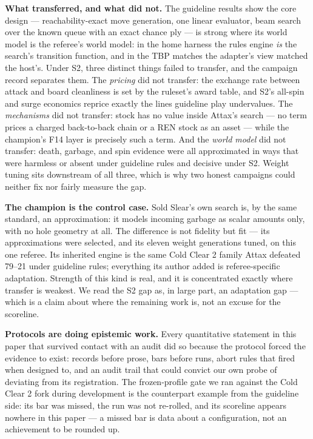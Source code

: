 \documentclass[
  11pt,
]{article}
\begin{document}
\textbf{What transferred, and what did not.} The guideline results show
the core design --- reachability-exact move generation, one linear
evaluator, beam search over the known queue with an exact chance ply ---
is strong where its world model is the referee's world model: in the
home harness the rules engine \emph{is} the search's transition
function, and in the TBP matches the adapter's view matched the host's.
Under S2, three distinct things failed to transfer, and the campaign
record separates them. The \emph{pricing} did not transfer: the exchange
rate between attack and board cleanliness is set by the ruleset's award
table, and S2's all-spin and surge economics reprice exactly the lines
guideline play undervalues. The \emph{mechanisms} did not transfer:
stock has no value inside Attax's search --- no term prices a charged
back-to-back chain or a REN stock as an asset --- while the champion's
F14 layer is precisely such a term. And the \emph{world model} did not
transfer: death, garbage, and spin evidence were all approximated in
ways that were harmless or absent under guideline rules and decisive
under S2. Weight tuning sits downstream of all three, which is why two
honest campaigns could neither fix nor fairly measure the gap.

\textbf{The champion is the control case.} Sold Slear's own search is,
by the same standard, an approximation: it models incoming garbage as
scalar amounts only, with no hole geometry at all. The difference is not
fidelity but fit --- its approximations were selected, and its eleven
weight generations tuned, on this one referee. Its inherited engine is
the same Cold Clear 2 family Attax defeated 79--21 under guideline
rules; everything its author added is referee-specific adaptation.
Strength of this kind is real, and it is concentrated exactly where
transfer is weakest. We read the S2 gap as, in large part, an adaptation
gap --- which is a claim about where the remaining work is, not an
excuse for the scoreline.

\textbf{Protocols are doing epistemic work.} Every quantitative
statement in this paper that survived contact with an audit did so
because the protocol forced the evidence to exist: records before prose,
bars before runs, abort rules that fired when designed to, and an audit
trail that could convict our own probe of deviating from its
registration. The frozen-profile gate we ran against the Cold Clear 2
fork during development is the counterpart example from the guideline
side: its bar was missed, the run was not re-rolled, and its scoreline
appears nowhere in this paper --- a missed bar is data about a
configuration, not an achievement to be rounded up.
\end{document}
